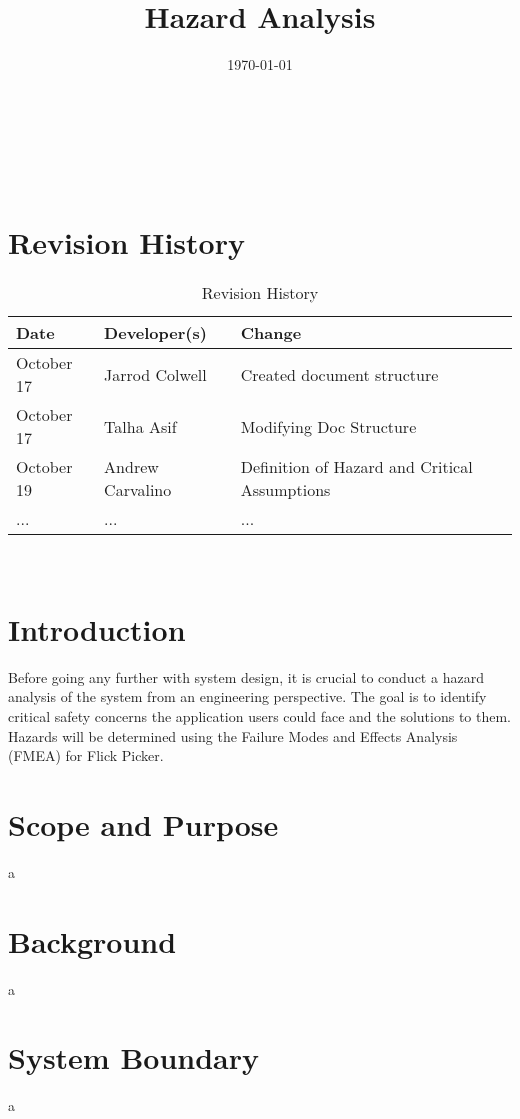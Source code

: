 \documentclass[12pt]{article}
\title{Hazard Analysis\\\progname}
\author{\authname}
\date{\today}
\begin{document}
\maketitle

~\newpage {}

\tableofcontents

~\newpage

\section*{Revision History}
\begin{table}[hp]
	\caption{Revision History} \label{TblRevisionHistory}
	\begin{tabularx}{\textwidth}{llX}
		\toprule
		\textbf{Date} & \textbf{Developer(s)} & \textbf{Change}\\
		\midrule
		October 17 & Jarrod Colwell & Created document structure\\
		October 17 & Talha Asif & Modifying Doc Structure\\
		October 19 & Andrew Carvalino & Definition of Hazard and Critical Assumptions\\
		... & ... & ...\\
		\bottomrule
		\end{tabularx}
\end{table}

~\newpage {}

\section{Introduction}
Before going any further with system design, it is crucial to conduct a hazard analysis of the system from an engineering perspective. The goal is to identify critical safety concerns the application users could face and the solutions to them. Hazards will be determined using the Failure Modes and Effects Analysis (FMEA) for Flick Picker.

\section{Scope and Purpose}
a

\section{Background}
a

\section{System Boundary}
a
\end{document}
